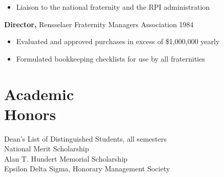 \documentclass[margin]{res}
\begin{document}
\begin{resume}
\begin{itemize}
                 \item Liaison to the national fraternity and the RPI 
                 administration 
		 \end{itemize}

                  {\bf  Director,}  Rensselaer Fraternity Managers 
              Association     \hfill                                 1984 
                 \begin{itemize} \itemsep -2pt

               \item    Evaluated and approved purchases in excess of 
                 {\$}1,000,000 yearly 
                 
               \item  Formulated bookkeeping checklists for use by all 
                 fraternities 
		 \end{itemize}

\section{Academic \\ Honors} 
Dean's List of Distinguished Students, all semesters \\
National Merit Scholarship \\
Alan T. Hundert Memorial Scholarship \\
 Epsilon Delta Sigma, Honorary Management Society 
 

\end{resume} 
\end{document}
